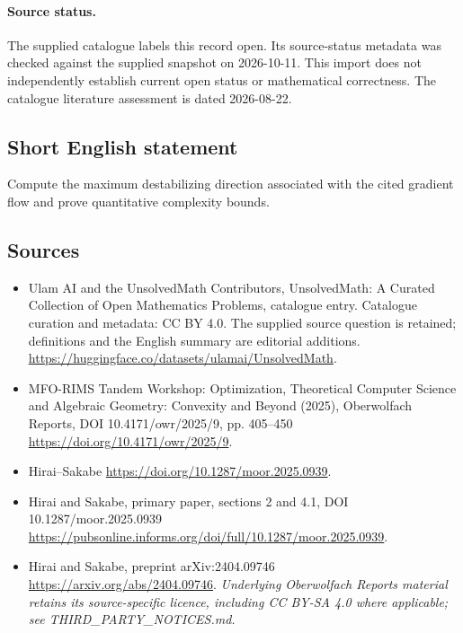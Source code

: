 \documentclass[11pt]{article}
\begin{document}
\paragraph{Source status.}
The supplied catalogue labels this record open. Its source-status metadata was checked against the supplied snapshot on 2026-10-11. This import does not independently establish current open status or mathematical correctness. The catalogue literature assessment is dated 2026-08-22.
\subsection{Short English statement}
Compute the maximum destabilizing direction associated with the cited gradient flow and prove quantitative complexity bounds.
\subsection{Sources}
\begin{itemize}
\item[\hypertarget{source:statement:1}{S1}] Ulam AI and the UnsolvedMath Contributors, UnsolvedMath: A Curated Collection of Open Mathematics Problems, catalogue entry. Catalogue curation and metadata: CC BY 4.0. The supplied source question is retained; definitions and the English summary are editorial additions.
\url{https://huggingface.co/datasets/ulamai/UnsolvedMath}.
\item[\hypertarget{source:statement:2}{S2}] MFO-RIMS Tandem Workshop: Optimization, Theoretical Computer Science and Algebraic Geometry: Convexity and Beyond (2025), Oberwolfach Reports, DOI 10.4171/owr/2025/9, pp. 405--450
\url{https://doi.org/10.4171/owr/2025/9}.
\item[\hypertarget{source:statement:3}{S3}] Hirai--Sakabe
\url{https://doi.org/10.1287/moor.2025.0939}.
\item[\hypertarget{source:statement:4}{S4}] Hirai and Sakabe, primary paper, sections 2 and 4.1, DOI 10.1287/moor.2025.0939
\url{https://pubsonline.informs.org/doi/full/10.1287/moor.2025.0939}.
\item[\hypertarget{source:statement:5}{S5}] Hirai and Sakabe, preprint arXiv:2404.09746
\url{https://arxiv.org/abs/2404.09746}.
\textit{Underlying Oberwolfach Reports material retains its source-specific licence, including CC BY-SA 4.0 where applicable; see THIRD\_PARTY\_NOTICES.md.}
\end{itemize}
\end{document}
